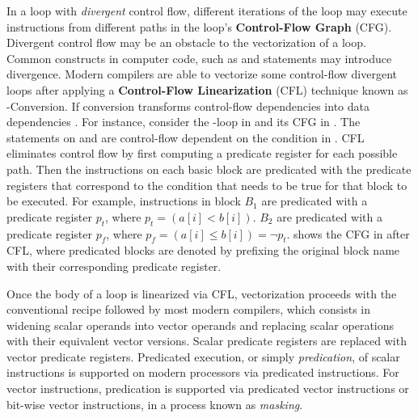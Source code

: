 In a loop with \emph{divergent} control flow,  different iterations of the loop may execute instructions from different paths in the loop's \textbf{Control-Flow Graph} (CFG).
Divergent control flow may be an obstacle to the vectorization of a loop.
Common constructs in computer code, such as  and  statements may introduce divergence.
Modern compilers are able to vectorize some control-flow divergent loops after applying a \textbf{Control-Flow Linearization} (CFL) technique known as -Conversion.
If conversion transforms control-flow dependencies into data dependencies \cite{allen_conversion_1983, park1991ifconversion}.
For instance, consider the -loop in  and its CFG in .
The statements on  and  are control-flow dependent on the condition in .
CFL eliminates control flow by first computing a predicate register for each possible path.
Then the instructions on each basic block are predicated with the predicate registers that correspond to the condition that needs to be true for that block to be executed.
For example, instructions in block $B_1$ are predicated with a predicate register $p_t$, where $p_t = (a[i] < b[i])$.
$B_2$ are predicated with a predicate register $p_f$, where $p_f = (a[i] \leq b[i]) = \neg p_t$.
 shows the CFG in  after CFL, where predicated blocks are denoted by prefixing the original block name with their corresponding predicate register.

Once the body of a loop is linearized via CFL, vectorization proceeds with the conventional recipe followed by most modern compilers, which consists in widening scalar operands into vector operands and replacing scalar operations with their equivalent vector versions.
Scalar predicate registers are replaced with vector predicate registers.
Predicated execution, or simply \emph{predication}, of scalar instructions is supported on modern processors via predicated instructions.
For vector instructions, predication is supported via predicated vector instructions or bit-wise vector instructions, in a process known as \emph{masking}.

